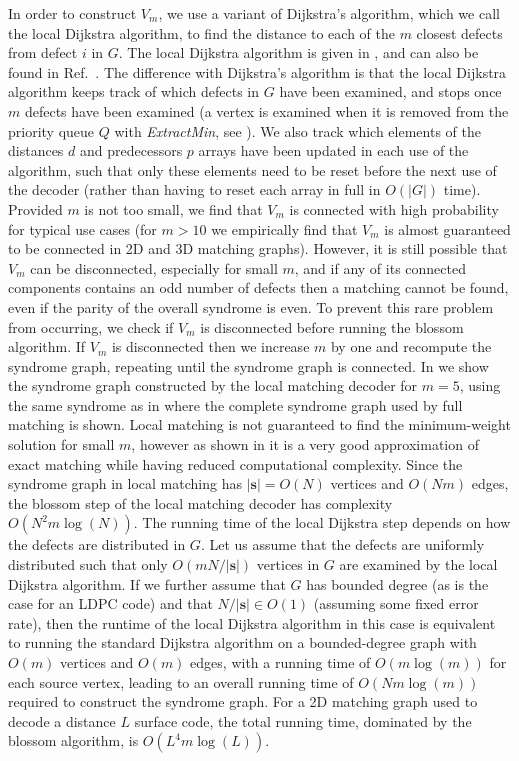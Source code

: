 \documentclass{article}
\begin{document}
In order to construct $V_m$, we use a variant of Dijkstra's algorithm, which we call the local Dijkstra algorithm, to find the distance to each of the $m$ closest defects from defect $i$ in $G$.
The local Dijkstra algorithm is given in , and can also be found in Ref.~\cite{higgott2020subsystem}.
The difference with Dijkstra's algorithm is that the local Dijkstra algorithm keeps track of which defects in $G$ have been examined, and stops once $m$ defects have been examined (a vertex is examined when it is removed from the priority queue $Q$ with \textit{ExtractMin}, see ).
We also track which elements of the distances $d$ and predecessors $p$ arrays have been updated in each use of the algorithm, such that only these elements need to be reset before the next use of the decoder (rather than having to reset each array in full in $O(|G|)$ time).
Provided $m$ is not too small, we find that $V_m$ is connected with high probability for typical use cases (for $m>10$ we empirically find that $V_m$ is almost guaranteed to be connected in 2D and 3D matching graphs).
However, it is still possible that $V_m$ can be disconnected, especially for small $m$, and if any of its connected components contains an odd number of defects then a matching cannot be found, even if the parity of the overall syndrome is even.
To prevent this rare problem from occurring, we check if $V_m$ is disconnected before running the blossom algorithm. 
If $V_m$ is disconnected then we increase $m$ by one and recompute the syndrome graph, repeating until the syndrome graph is connected.
In  we show the syndrome graph constructed by the local matching decoder for $m=5$, using the same syndrome as in  where the complete syndrome graph used by full matching is shown.
Local matching is not guaranteed to find the minimum-weight solution for small $m$, however as shown in  it is a very good approximation of exact matching while having reduced computational complexity.
Since the syndrome graph in local matching has $|\mathbf{s}|=O(N)$ vertices and $O(Nm)$ edges, the blossom step of the local matching decoder has complexity $O(N^2m\log(N))$.
The running time of the local Dijkstra step depends on how the defects are distributed in $G$.
Let us assume that the defects are uniformly distributed such that only $O(mN/|\mathbf{s}|)$ vertices in $G$ are examined by the local Dijkstra algorithm.
If we further assume that $G$ has bounded degree (as is the case for an LDPC code) and that $N/|\mathbf{s}|\in O(1)$ (assuming some fixed error rate), then the runtime of the local Dijkstra algorithm in this case is equivalent to running the standard Dijkstra algorithm on a bounded-degree graph with $O(m)$ vertices and $O(m)$ edges, with a running time of $O(m\log(m))$ for each source vertex, leading to an overall running time of $O(Nm\log(m))$ required to construct the syndrome graph.
For a 2D matching graph used to decode a distance $L$ surface code, the total running time, dominated by the blossom algorithm, is $O(L^4m\log(L))$.
\end{document}
